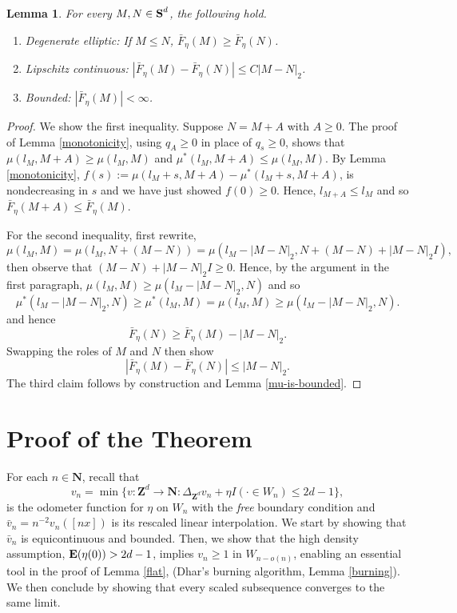 \documentclass[12pt]{amsart}
\newcommand{\Z}{\mathbf{Z}}
\newcommand{\N}{\mathbf{N}}
\newcommand{\symm}{{\mbox{\bf S}}}  %
\newcommand{\E}{\mathop{\bf E{}}}
\newtheorem{lemma}[theorem]{Lemma}
\begin{document}
\begin{lemma} \label{lemma:basic_effective}
For every $M, N \in \symm^d$, the following hold. 
\begin{enumerate}
\item
Degenerate elliptic:   If $M \leq N$, $\bar{F}_{\eta}(M) \geq \bar{F}_{\eta}(N)$. 
\item Lipschitz continuous:  $|\bar{F}_{\eta}(M) - \bar{F}_{\eta}(N)| \leq C |M-N|_2$. 
\item Bounded:  $|\bar{F}_{\eta}(M)| < \infty$. 
\end{enumerate}

\end{lemma}

\begin{proof}
We show the first inequality. Suppose $N = M + A$ with $A \geq 0$. 
The proof of Lemma \ref{monotonicity}, using $q_A \geq 0$ in place of $q_s \geq 0$, shows that 
$\mu(l_M, M+A) \geq \mu(l_M, M)$ and $\mu^*(l_M, M+A) \leq \mu(l_M, M)$.
By Lemma \ref{monotonicity}, $f(s) := \mu(l_M+s,M+A) - \mu^*(l_M+s,M+A)$, is nondecreasing in $s$
and we have just showed $f(0) \geq 0$.  Hence, $l_{M+A} \leq l_M$ and so $\bar{F}_{\eta}(M+A) \leq \bar{F}_{\eta}(M)$.  


For the second inequality, first rewrite, 
\[
\mu(l_M, M) = \mu(l_M, N + (M-N)) = \mu(l_M - |M-N|_2, N + (M-N) + |M-N|_2 I ), 
\]
then observe that $(M-N) + |M-N|_2  I \geq 0$. Hence, by the argument in the first paragraph, 
$\mu(l_M, M) \geq \mu(l_M - |M-N|_2, N)$
and so 
\[
\mu^*(l_M - |M-N|_2, N) \geq \mu^*(l_M,M) = \mu(l_M, M) \geq \mu(l_M - |M-N|_2, N).  
\]
and hence 
\[
\bar{F}_{\eta}(N) \geq \bar{F}_{\eta}(M) - |M-N|_2.
\]
Swapping the roles of $M$ and $N$ then show  
\[
|\bar{F}_{\eta}(M) - \bar{F}_{\eta}(N)|  \leq |M-N|_2. 
\]
The third claim follows by construction and Lemma \ref{mu-is-bounded}. 







\end{proof}







\section{Proof of the Theorem}\label{sec:proof_of_theorem}
For each $n \in \N$, recall that
\[
v_n = \min \{ v : \Z^d \to \N: \Delta_{\Z^d} v_n + \eta I(\cdot \in W_n) \leq 2 d-1 \}, 
\]
is the odometer function for $\eta$ on $W_n$ with the {\it free} boundary condition and $\bar{v}_n = n^{-2} v_n([n x])$ is its rescaled linear interpolation.  
We start by showing that $\bar{v}_n$ is equicontinuous and bounded. Then, we show that the high density assumption, $\E(\eta(0))  > 2 d -1$, 
implies $v_n \geq 1$ in $W_{n - o(n)}$, enabling an essential tool in the proof of Lemma \ref{flat}, (Dhar's burning algorithm, Lemma \ref{burning}). 
We then conclude by showing that every scaled subsequence converges to the same limit. 
\end{document}
